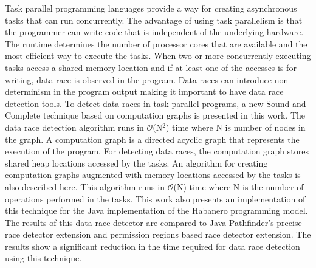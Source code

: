 Task parallel programming languages provide a way for creating asynchronous tasks that can run concurrently. The advantage of using task parallelism is that the programmer can write code that is independent of the underlying hardware. The runtime determines the number of processor cores that are available and the most efficient way to execute the tasks. When two or more concurrently executing tasks access a shared memory location and if at least one of the accesses is for writing, data race is observed in the program. Data races can introduce non-determinism in the program output making it important to have data race detection tools. To detect data races in task parallel programs, a new Sound and Complete technique based on computation graphs is presented in this work. The data race detection algorithm runs in $\mathcal{O}$(N$^2$) time where N is number of nodes in the graph. A computation graph is a directed acyclic graph that represents the execution of the program. For detecting data races, the computation graph stores shared heap locations accessed by the tasks. An algorithm for creating computation graphs augmented with memory locations accessed by the tasks is also described here. This algorithm runs in $\mathcal{O}$(N) time where N is the number of operations performed in the tasks. This work also presents an implementation of this technique for the Java implementation of the Habanero programming model. The results of this data race detector are compared to Java Pathfinder's precise race detector extension and permission regions based race detector extension. The results show a significant reduction in the time required for data race detection using this technique.
